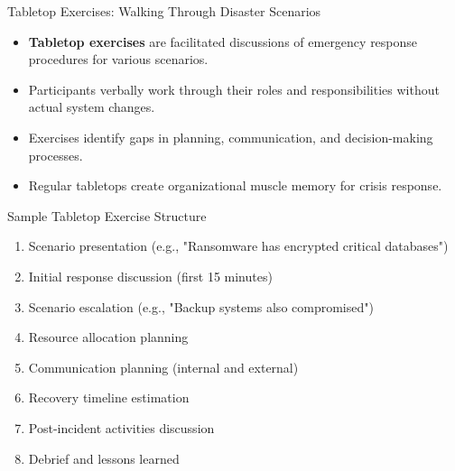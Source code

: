 \documentclass{beamer}
\begin{document}
\begin{frame}{Tabletop Exercises: Walking Through Disaster Scenarios}
    \begin{itemize}
        \item \textbf{Tabletop exercises} are facilitated discussions of emergency response procedures for various scenarios.
        \item Participants verbally work through their roles and responsibilities without actual system changes.
        \item Exercises identify gaps in planning, communication, and decision-making processes.
        \item Regular tabletops create organizational muscle memory for crisis response.
    \end{itemize}
    
    \begin{exampleblock}{Sample Tabletop Exercise Structure}
        \scriptsize
        \begin{enumerate}
            \item Scenario presentation (e.g., "Ransomware has encrypted critical databases")
            \item Initial response discussion (first 15 minutes)
            \item Scenario escalation (e.g., "Backup systems also compromised")
            \item Resource allocation planning
            \item Communication planning (internal and external)
            \item Recovery timeline estimation
            \item Post-incident activities discussion
            \item Debrief and lessons learned
        \end{enumerate}
    \end{exampleblock}
\end{frame}
\end{document}
